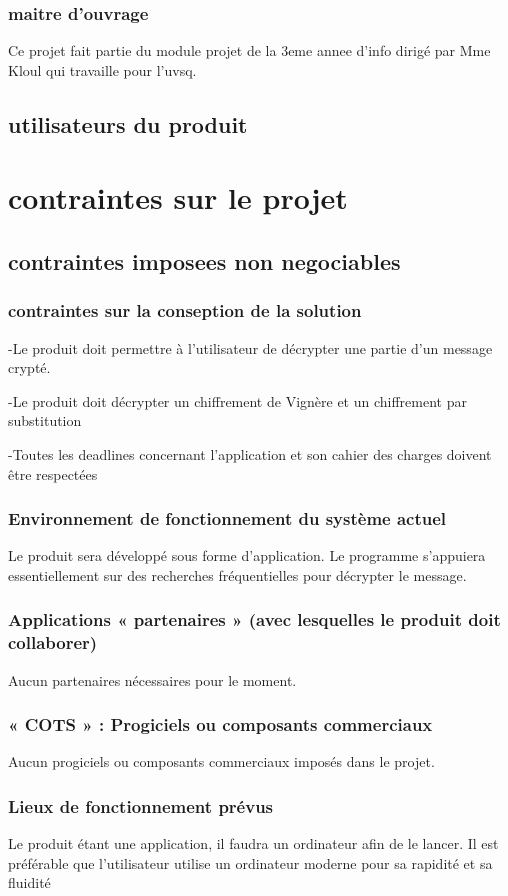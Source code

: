 \documentclass[a4]{article}
\begin{document}
			\subsubsection{maitre d'ouvrage}
				Ce projet fait partie du module projet de la 3eme annee d'info dirigé par Mme Kloul qui travaille pour l'uvsq.			
		\subsection{utilisateurs du produit}
			
	\section{contraintes sur le projet}
		\subsection{contraintes imposees non negociables} 
			\subsubsection{contraintes sur la conseption de la solution}
				-Le produit doit permettre à l'utilisateur de décrypter une partie d'un message crypté.

				-Le produit doit décrypter un chiffrement de Vignère et un chiffrement par substitution

				-Toutes les deadlines concernant l'application et son cahier des charges doivent être respectées
			\subsubsection{ Environnement de fonctionnement du système actuel }
				Le produit sera développé sous forme d'application. 
				Le programme s'appuiera essentiellement sur des recherches fréquentielles pour décrypter le message.
			\subsubsection{Applications « partenaires » (avec lesquelles le produit doit collaborer)}
				Aucun partenaires nécessaires pour le moment.
			\subsubsection{« COTS » : Progiciels ou composants commerciaux}
				Aucun progiciels ou composants commerciaux imposés dans le projet.
			\subsubsection{Lieux de fonctionnement prévus}
				Le produit étant une application, il faudra un ordinateur afin de le lancer.
				Il est préférable que l'utilisateur utilise un ordinateur moderne pour sa rapidité et sa fluidité
\end{document}
